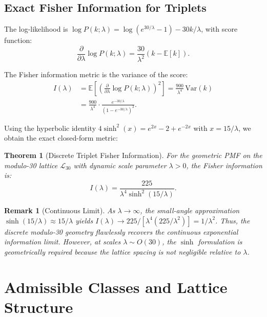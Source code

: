 \documentclass[11pt]{article}
\newtheorem{theorem}{Theorem}
\newtheorem{remark}{Remark}
\begin{document}
\subsection{Exact Fisher Information for Triplets}

The log-likelihood is $\log P(k; \lambda) = \log(e^{30/\lambda} - 1) - 30k/\lambda$, with score function:
\begin{equation}
    \frac{\partial}{\partial \lambda} \log P(k; \lambda) = \frac{30}{\lambda^2}\left(k - \mathbb{E}[k]\right).
\end{equation}

The Fisher information metric is the variance of the score:
\begin{align}
    I(\lambda) &= \mathbb{E}\left[\left(\frac{\partial}{\partial \lambda} \log P(k; \lambda)\right)^2\right] = \frac{900}{\lambda^4}\,\text{Var}(k) \nonumber\\
    &= \frac{900}{\lambda^4} \cdot \frac{e^{-30/\lambda}}{(1 - e^{-30/\lambda})^2}.
\end{align}

Using the hyperbolic identity $4\sinh^2(x) = e^{2x} - 2 + e^{-2x}$ with $x = 15/\lambda$, we obtain the exact closed-form metric:

\begin{theorem}[Discrete Triplet Fisher Information]
For the geometric PMF on the modulo-30 lattice $\mathcal{L}_{30}$ with dynamic scale parameter $\lambda > 0$, the Fisher information is:
\begin{equation}
    I(\lambda) = \frac{225}{\lambda^4 \sinh^2(15/\lambda)}.
\end{equation}
\end{theorem}

\begin{remark}[Continuous Limit]
As $\lambda \to \infty$, the small-angle approximation $\sinh(15/\lambda) \approx 15/\lambda$ yields $I(\lambda) \to 225/[\lambda^4 (225/\lambda^2)] = 1/\lambda^2$. Thus, the discrete modulo-30 geometry flawlessly recovers the continuous exponential information limit. However, at scales $\lambda \sim O(30)$, the $\sinh$ formulation is geometrically required because the lattice spacing is not negligible relative to $\lambda$.
\end{remark}

\section{Admissible Classes and Lattice Structure}
\end{document}
